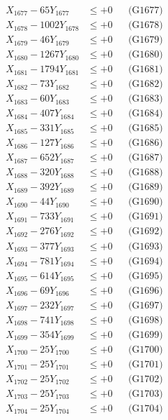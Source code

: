 \documentclass[a4paper,10pt]{article}
\begin{document}
{\begin{align}
X_{1677} - 65Y_{1677} &\leq +0 && \text{(G1677)} \\
X_{1678} - 1002Y_{1678} &\leq +0 && \text{(G1678)} \\
X_{1679} - 46Y_{1679} &\leq +0 && \text{(G1679)} \\
X_{1680} - 1267Y_{1680} &\leq +0 && \text{(G1680)} \\
\allowbreak
X_{1681} - 1794Y_{1681} &\leq +0 && \text{(G1681)} \\
X_{1682} - 73Y_{1682} &\leq +0 && \text{(G1682)} \\
X_{1683} - 60Y_{1683} &\leq +0 && \text{(G1683)} \\
X_{1684} - 407Y_{1684} &\leq +0 && \text{(G1684)} \\
X_{1685} - 331Y_{1685} &\leq +0 && \text{(G1685)} \\
X_{1686} - 127Y_{1686} &\leq +0 && \text{(G1686)} \\
X_{1687} - 652Y_{1687} &\leq +0 && \text{(G1687)} \\
X_{1688} - 320Y_{1688} &\leq +0 && \text{(G1688)} \\
X_{1689} - 392Y_{1689} &\leq +0 && \text{(G1689)} \\
X_{1690} - 44Y_{1690} &\leq +0 && \text{(G1690)} \\
\allowbreak
X_{1691} - 733Y_{1691} &\leq +0 && \text{(G1691)} \\
X_{1692} - 276Y_{1692} &\leq +0 && \text{(G1692)} \\
X_{1693} - 377Y_{1693} &\leq +0 && \text{(G1693)} \\
X_{1694} - 781Y_{1694} &\leq +0 && \text{(G1694)} \\
X_{1695} - 614Y_{1695} &\leq +0 && \text{(G1695)} \\
X_{1696} - 69Y_{1696} &\leq +0 && \text{(G1696)} \\
X_{1697} - 232Y_{1697} &\leq +0 && \text{(G1697)} \\
X_{1698} - 741Y_{1698} &\leq +0 && \text{(G1698)} \\
X_{1699} - 354Y_{1699} &\leq +0 && \text{(G1699)} \\
X_{1700} - 25Y_{1700} &\leq +0 && \text{(G1700)} \\
\allowbreak
X_{1701} - 25Y_{1701} &\leq +0 && \text{(G1701)} \\
X_{1702} - 25Y_{1702} &\leq +0 && \text{(G1702)} \\
X_{1703} - 25Y_{1703} &\leq +0 && \text{(G1703)} \\
X_{1704} - 25Y_{1704} &\leq +0 && \text{(G1704)} \\

\end{align}}
\end{document}
